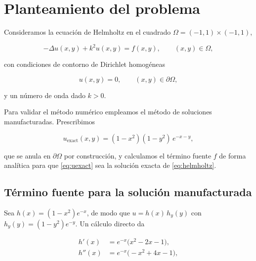 \documentclass[11pt,a4paper,twoside,pdf]{article}
\numberwithin{equation}{section}
\begin{document}

\tableofcontents

\pagestyle{fancy}
\fancyhead[RO,LE]{\leftmark}
\fancyhead[LO,RE]{\thepage}
\fancyfoot{}

\newpage

\section{Planteamiento del problema}
\label{sec:intro}

Consideramos la ecuación de Helmholtz en el cuadrado
$\Omega = (-1,1)\times(-1,1)$,

\begin{equation}
\label{eq:helmholtz}
-\Delta u(x,y) + k^{2} u(x,y) = f(x,y),
\qquad (x,y) \in \Omega,
\end{equation}

con condiciones de contorno de Dirichlet homogéneas

\begin{equation}
u(x,y) = 0,
\qquad (x,y) \in \partial\Omega,
\end{equation}

y un número de onda dado $k > 0$.

Para validar el método numérico empleamos el método de soluciones
manufacturadas. Prescribimos

\begin{equation}
\label{eq:uexact}
u_{\text{exact}}(x,y) = (1-x^{2})(1-y^{2})\, e^{-x-y},
\end{equation}

que se anula en $\partial\Omega$ por construcción, y calculamos el
término fuente $f$ de forma analítica para que \eqref{eq:uexact} sea
la solución exacta de \eqref{eq:helmholtz}.

\subsection{Término fuente para la solución manufacturada}

Sea $h(x) = (1-x^{2}) e^{-x}$, de modo que
$u = h(x)\, h_{y}(y)$ con $h_{y}(y) = (1-y^{2}) e^{-y}$. Un cálculo
directo da

\begin{align*}
h'(x)  &= e^{-x}\bigl(x^{2} - 2x - 1\bigr), \\
h''(x) &= e^{-x}\bigl(-x^{2} + 4x - 1\bigr),
\end{align*}
\end{document}
